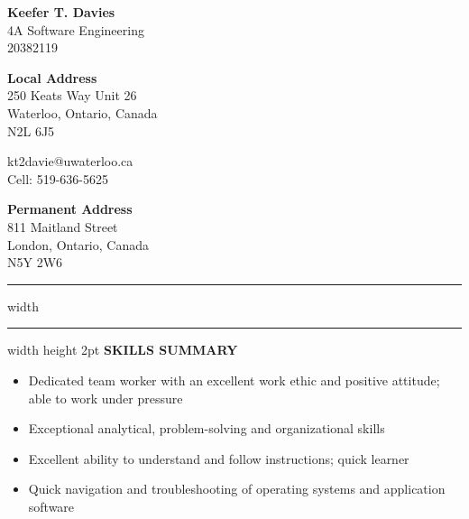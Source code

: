 \documentclass[10pt,letterpaper]{article}
\begin{document}
\begin{center}
    {\Large \textbf{Keefer T. Davies}}\\		
    4A Software Engineering\\
    20382119
\end{center}
\begin{minipage}{0.33\columnwidth}
    \textbf{Local Address}\\
    250 Keats Way Unit 26\\		
    Waterloo, Ontario, Canada\\		
    N2L 6J5
\end{minipage}
\begin{minipage}{0.33\columnwidth}
    \begin{center}
	kt2davie@uwaterloo.ca\\			
	Cell: 519-636-5625
    \end{center}
\end{minipage}
\begin{minipage}{0.33\columnwidth}
    \begin{adjustwidth}{0.25\columnwidth}{}
	{\textbf{Permanent Address}}\\			
	811 Maitland Street\\			
	London, Ontario, Canada\\			
	N5Y 2W6
    \end{adjustwidth}
\end{minipage}
\vspace{1em}
\hrule width \hsize \kern 1mm \hrule width \hsize height 2pt 
\vspace{1em}
\noindent \textbf{SKILLS SUMMARY} \hrulefill \\
\begin{adjustwidth}{0.1in}{0.5in}    
    \begin{itemize}
	\item Dedicated team worker with an excellent work ethic and positive attitude; able to work under pressure
	\item Exceptional analytical, problem-solving and organizational skills
	\item Excellent ability to understand and follow instructions; quick learner
	\item Quick navigation and troubleshooting of operating systems and application software
    \end{itemize}
\end{adjustwidth}
\vspace{1em}
\end{document}
